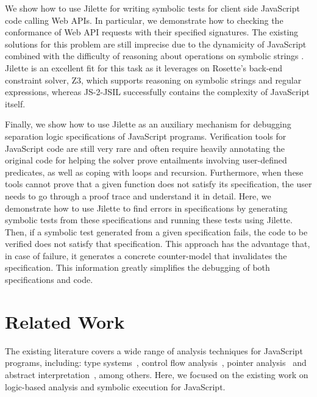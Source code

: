 \documentclass{llncs}
\newcommand{\jilette}{Jilette\xspace}
\begin{document}
We show how  to use Jilette for writing symbolic tests for client side 
JavaScript code calling Web APIs. In particular, we demonstrate how to 
checking the conformance of Web API requests with their specified signatures. 
The existing solutions for this problem are still imprecise due to the 
dynamicity of JavaScript combined with the difficulty of reasoning about
operations on symbolic strings \cite{Idontknow}. Jilette is an excellent fit for
this task as it leverages on Rosette's back-end
constraint solver, Z3, which supports reasoning on symbolic strings
and regular expressions, whereas JS-2-JSIL successfully
contains the complexity of JavaScript itself.

Finally, we show how to use Jilette as an auxiliary mechanism for debugging 
separation logic specifications of JavaScript programs. Verification tools for  
JavaScript code are still very rare and often require heavily annotating the 
original code for helping the solver prove entailments involving user-defined 
predicates, as well as coping with loops and recursion. Furthermore, when these 
tools cannot prove that a given function does not satisfy its specification, the 
user needs to go through a  proof trace and understand it in detail. 
Here, we demonstrate how to use \jilette to find errors in specifications by generating 
symbolic tests from these specifications and running these tests using \jilette. 
Then, if a symbolic test generated from a given specification fails, the code to 
be verified does not satisfy that specification. This approach has the advantage that,
 in case of failure, it  generates a concrete counter-model that invalidates the 
 specification. This information greatly simplifies the debugging of both specifications and code. 


\section{Related Work} 

The existing literature covers a wide range of analysis techniques for JavaScript programs, including: 
type systems~\cite{thiemann:esop:2005,anderson:ecoop:2005,jensen:sas:2009,typescript:toot:2014,feldthaus:oopsla:2014,bierman:ecoop:2014,rastogi:popl:2015},
control flow analysis~\cite{feldthaus2013efficient}, pointer analysis~\cite{jang2009points,sridharan:ecoop:12} and abstract
interpretation~\cite{kashyap:fse:14,jensen:sas:2009,andreasen:oopsla:2014,park:ecoop:15}, among others. 
Here, we focused on the existing work on logic-based analysis and symbolic execution for JavaScript. 
\end{document}
